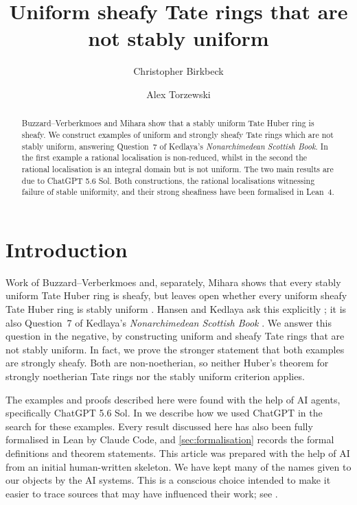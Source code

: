 \documentclass[11pt,reqno]{amsart}
\title{Uniform sheafy Tate rings that are not stably uniform}
\author{Christopher Birkbeck}
\author{Alex Torzewski}
\date{}
\theoremstyle{definition}
\begin{document}
\begin{abstract}
Buzzard--Verberkmoes and Mihara show that a stably uniform Tate Huber
ring is sheafy.  We construct examples of uniform and strongly sheafy Tate rings
which are not stably uniform, answering Question~7 of Kedlaya's
\emph{Nonarchimedean Scottish Book}.  In the first example a rational
localisation is non-reduced, whilst in the second the rational localisation
is an integral domain but is not uniform.  The two main results are due to
ChatGPT 5.6 Sol.
Both constructions, the rational localisations witnessing failure of stable
uniformity, and their strong sheafiness have been formalised in Lean~4.
\end{abstract}


\maketitle

\section{Introduction}

Work of Buzzard--Verberkmoes and, separately, Mihara shows that every stably
uniform Tate Huber ring is sheafy, but leaves open whether every uniform sheafy
Tate Huber ring is stably uniform \cite{BV,Mihara}.  Hansen and Kedlaya ask
this explicitly \cite[Remark~3.16]{HK}; it is also Question~7 of Kedlaya's
\emph{Nonarchimedean Scottish Book} \cite{Scottish}.  We answer this question
in the negative, by constructing uniform and sheafy Tate rings that are not
stably uniform.  In fact, we prove the stronger statement that both examples
are strongly sheafy.
Both are non-noetherian, so neither Huber's theorem for strongly noetherian
Tate rings nor the stably uniform criterion applies.

The examples and proofs described here were found with the help of AI agents,
specifically ChatGPT 5.6 Sol.  In  we describe how we used
ChatGPT in the search for these examples.  Every result discussed here has
also been fully formalised in Lean by Claude Code, and
\cref{sec:formalisation} records the formal definitions and theorem
statements.  This article was prepared with the help of AI from an initial
human-written skeleton.  We have kept many of the names given to our objects
by the AI systems.  This is a conscious choice intended to make it easier to
trace sources that may have influenced their work; see
.
\end{document}
